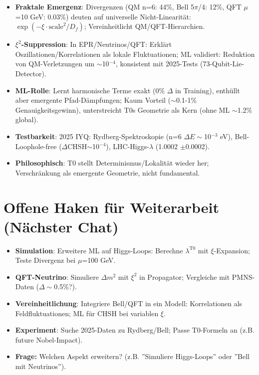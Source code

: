 	\begin{itemize}
		\item \textbf{Fraktale Emergenz}: Divergenzen (QM n=6: 44\%, Bell 5$\pi$/4: 12\%, QFT $\mu$=10 GeV: 0.03\%) deuten auf universelle Nicht-Linearität: $\exp(-\xi \cdot \text{scale}^2 / D_f)$; Vereinheitlicht QM/QFT-Hierarchien.
		\item \textbf{$\xi^2$-Suppression}: In EPR/Neutrinos/QFT: Erklärt Oszillationen/Korrelationen als lokale Fluktuationen; ML validiert: Reduktion von QM-Verletzungen um $\sim$10$^{-4}$, konsistent mit 2025-Tests (73-Qubit-Lie-Detector).
		\item \textbf{ML-Rolle}: Lernt harmonische Terme exakt (0\% $\Delta$ in Training), enthüllt aber emergente Pfad-Dämpfungen; Kaum Vorteil ($\sim$0.1-1\% Genauigkeitsgewinn), unterstreicht T0s Geometrie als Kern (ohne ML $\sim$1.2\% global).
		\item \textbf{Testbarkeit}: 2025 IYQ: Rydberg-Spektroskopie (n=6 $\Delta E\sim$10$^{-3}$ eV), Bell-Loophole-free ($\Delta$CHSH$\sim$10$^{-4}$), LHC-Higgs-$\lambda$ (1.0002 $\pm$0.0002).
		\item \textbf{Philosophisch}: T0 stellt Determinismus/Lokalität wieder her; Verschränkung als emergente Geometrie, nicht fundamental.
	\end{itemize}
	
	\section{Offene Haken für Weiterarbeit (Nächster Chat)}
	
	\begin{itemize}
		\item \textbf{Simulation}: Erweitere ML auf Higgs-Loops: Berechne $\lambda^{\text{T0}}$ mit $\xi$-Expansion; Teste Divergenz bei $\mu$=100 GeV.
		\item \textbf{QFT-Neutrino}: Simuliere $\Delta m^2$ mit $\xi^2$ in Propagator; Vergleiche mit PMNS-Daten ($\Delta\sim$0.5\%?).
		\item \textbf{Vereinheitlichung}: Integriere Bell/QFT in ein Modell: Korrelationen als Feldfluktuationen; ML für CHSH bei variablen $\xi$.
		\item \textbf{Experiment}: Suche 2025-Daten zu Rydberg/Bell; Passe T0-Formeln an (z.B. future Nobel-Impact).
		\item \textbf{Frage:} Welchen Aspekt erweitern? (z.B. ''Simuliere Higgs-Loops'' oder ''Bell mit Neutrinos'').
	\end{itemize}
	
